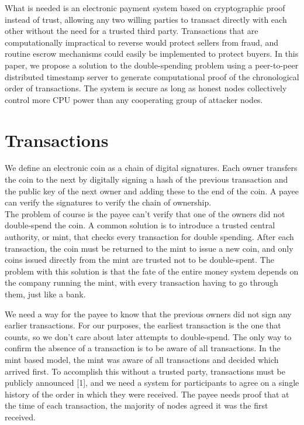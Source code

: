 \documentclass{article}
\begin{document}
What is needed is an electronic payment system based on cryptographic proof instead of trust,
allowing any two willing parties to transact directly with each other without the need for a trusted
third party.
Transactions that are computationally impractical to reverse would protect sellers
from fraud, and routine escrow mechanisms could easily be implemented to protect buyers.
In this paper, we propose a solution to the double-spending problem using a peer-to-peer distributed
timestamp server to generate computational proof of the chronological order of transactions.
The system is secure as long as honest nodes collectively control more CPU power than any
cooperating group of attacker nodes.

\section{Transactions}\label{sec:transactions}
We define an electronic coin as a chain of digital signatures.
Each owner transfers the coin to the next by digitally signing a hash of the previous transaction and the public key of the next owner
and adding these to the end of the coin.
A payee can verify the signatures to verify the chain of ownership.\\



The problem of course is the payee can't verify that one of the owners did not double-spend the coin.
A common solution is to introduce a trusted central authority, or mint, that checks every
transaction for double spending.
After each transaction, the coin must be returned to the mint to
issue a new coin, and only coins issued directly from the mint are trusted not to be double-spent.
The problem with this solution is that the fate of the entire money system depends on the
company running the mint, with every transaction having to go through them, just like a bank.

We need a way for the payee to know that the previous owners did not sign any earlier transactions.
For our purposes, the earliest transaction is the one that counts, so we don't care
about later attempts to double-spend.
The only way to confirm the absence of a transaction is to be aware of all transactions.
In the mint based model, the mint was aware of all transactions and
decided which arrived first.
To accomplish this without a trusted party, transactions must be
publicly announced [1], and we need a system for participants to agree on a single history of the
order in which they were received.
The payee needs proof that at the time of each transaction, the
majority of nodes agreed it was the first received.
\end{document}
